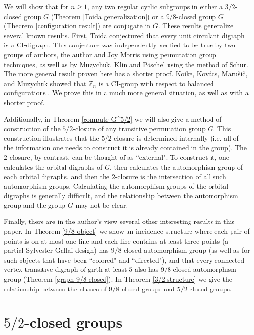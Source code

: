 \documentclass{amsart}
\theoremstyle{definition}
\theoremstyle{remark}
\numberwithin{equation}{section}
\def\Z{{\mathbb Z}}
\begin{document}
We will show that for $n\ge 1$, any two regular cyclic subgroups in either a $3/2$-closed group $G$ (Theorem \ref{Toida generalization}) or a $9/8$-closed group $G$ (Theorem \ref{configuration result}) are conjugate in $G$.  These results generalize several known results.  First, Toida conjectured that every unit circulant digraph is a CI-digraph.  This conjecture was independently verified to be true by two groups of authors, the author and Joy Morris \cite{DobsonM2002} using permutation group techniques, as well as by Muzychuk, Klin and P\"oschel \cite{MuzychukKP2001} using the method of Schur.  The more general result proven here has a shorter proof.  Koike, Kov\'acs, Maru\v si\v c, and Muzychuk showed that $\Z_n$ is a CI-group with respect to balanced configurations \cite{KoikeKMM2019}.  We prove this in a much more general situation, as well as with a shorter proof.

Additionally, in Theorem \ref{compute G^5/2} we will also give a method of construction of the $5/2$-closure of any transitive permutation group $G$.  This construction illustrates that the $5/2$-closure is determined internally (i.e. all of the information one needs to construct it is already contained in the group).  The $2$-closure, by contrast, can be thought of as ``external".  To construct it, one calculates the orbital digraphs of $G$, then calculates the automorphism group of each orbital digraphs, and then the $2$-closure is the intersection of all such automorphism groups.  Calculating the automorphism groups of the orbital digraphs is generally difficult, and the relationship between the automorphism group and the group $G$ may not be clear.

Finally, there are in the author's view several other interesting results in this paper.  In Theorem \ref{9/8 object} we show an incidence structure where each pair of points is on at most one line and each line contains at least three points (a partial Sylvester-Gallai design) has $9/8$-closed automorphism group (as well as for such objects that have been ``colored" and ``directed"), and that every connected vertex-transitive digraph of girth at least $5$ also has $9/8$-closed automorphism group (Theorem \ref{graph 9/8 closed}).  In Theorem \ref{3/2 structure} we give the relationship between the classes of $9/8$-closed groups and $5/2$-closed groups.

\section{$5/2$-closed groups}
\end{document}
